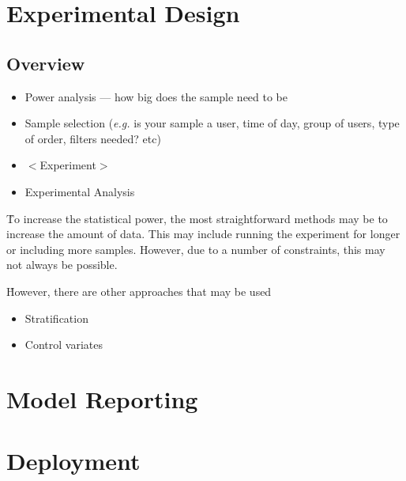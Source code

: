 
\chapter{Experimental Design}

\section{Overview}



\begin{itemize}[noitemsep,topsep=0pt]
	\item Power analysis --- how big does the sample need to be \ALR
	\item Sample selection (\textit{e.g.} is your sample a user, time of day, group of users, type of order, filters needed? etc) \ALR
	\item $<$Experiment$>$
	\item Experimental Analysis \ALR
\end{itemize}


\r{To increase the statistical power, the most straightforward methods may be to increase the amount of data. This may include running the experiment for longer or including more samples. However, due to a number of constraints, this may not always be possible.}

\r{However, there are other approaches that may be used}

\begin{itemize}[noitemsep,topsep=0pt]
	\item Stratification \ALR
	\item Control variates \ALR
\end{itemize}


\chapter{Model Reporting}


\chapter{Deployment}


